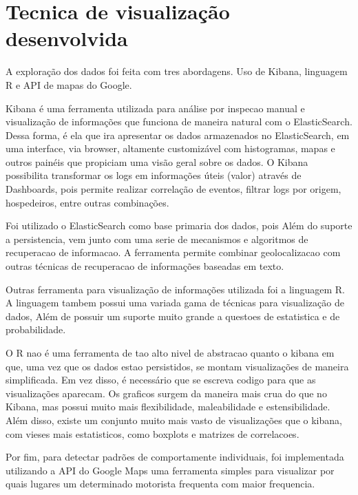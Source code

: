 \documentclass[10pt, conference]{IEEEtran}
\begin{document}
\section{Tecnica de visualização desenvolvida}
\label{sec:technique}
%

A exploração dos dados foi feita com tres abordagens. Uso de Kibana, linguagem R
e API de mapas do Google.

Kibana é uma ferramenta utilizada para análise por inspecao manual e visualização
de informações que funciona de maneira natural com o ElasticSearch. Dessa  forma, 
é  ela  que ira apresentar os dados armazenados no ElasticSearch, em uma interface,  via
browser, altamente customizável com histogramas, mapas e outros painéis que propiciam uma visão
geral sobre os dados.  O Kibana possibilita transformar os logs em informações úteis (valor)
através  de Dashboards,  pois  permite  realizar  correlação  de  eventos,  filtrar logs
por  origem, hospedeiros, entre outras combinações.

Foi utilizado o ElasticSearch como base primaria dos dados, pois Além do suporte a persistencia,
vem junto com uma serie de mecanismos e algoritmos de recuperacao de informacao. A ferramenta
permite combinar geolocalizacao com outras técnicas de recuperacao de informações baseadas
em texto.

Outras ferramenta para visualização de informações utilizada foi a linguagem R. A linguagem
tambem possui uma variada gama de técnicas para visualização de dados, Além de possuir um
suporte muito grande a questoes de estatistica e de probabilidade. 

O R nao é uma ferramenta de tao alto nivel de abstracao quanto o kibana em que, uma vez
que os dados estao persistidos, se montam visualizações de maneira simplificada. Em
vez disso, é necessário
que se escreva codigo para que as visualizações aparecam. Os graficos surgem da maneira
mais crua do que no Kibana, mas possui muito mais flexibilidade, maleabilidade
e estensibilidade. Além disso, existe um conjunto muito mais vasto de visualizações
que o kibana, com vieses mais estatisticos, como boxplots e matrizes de correlacoes.

Por fim, para detectar padrões de comportamente individuais, foi implementada utilizando
a API do Google Maps uma ferramenta simples para visualizar por quais lugares um determinado
motorista frequenta com maior frequencia.

\end{document}

